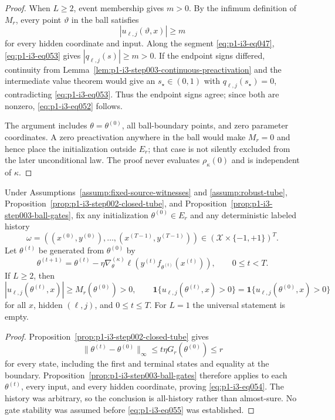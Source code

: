 \begin{proof}
When $L\geq2$, event membership gives $m>0$.  By the infimum definition of
$M_r$, every point $\vartheta$ in the ball satisfies
\[
|u_{\ell,j}(\vartheta,x)|\geq m
\tag{53}\label{eq:p1-i3-eq053}
\]
for every hidden coordinate and input.  Along the segment \eqref{eq:p1-i3-eq047}, \eqref{eq:p1-i3-eq053} gives
$|q_{\ell,j}(s)|\geq m>0$.  If the endpoint signs differed, continuity from
Lemma~\ref{lem:p1-i3-step003-continuous-preactivation} and the intermediate
value theorem would give an $s_\star\in(0,1)$ with
$q_{\ell,j}(s_\star)=0$, contradicting \eqref{eq:p1-i3-eq053}.  Thus the endpoint signs agree;
since both are nonzero, \eqref{eq:p1-i3-eq052} follows.

The argument includes $\theta=\theta^{(0)}$, all ball-boundary points, and
zero parameter coordinates.  A zero preactivation anywhere in the ball would
make $M_r=0$ and hence place the initialization outside $E_r$; that case is
not silently excluded from the later unconditional law.  The proof never
evaluates $\rho_\kappa(0)$ and is independent of $\kappa$.
\end{proof}

\begin{proposition}
\label{prop:p1-i3-step003-history-gates}
Under Assumptions~\ref{assump:fixed-source-witnesses} and
\ref{assump:robust-tube}, Proposition~\ref{prop:p1-i3-step002-closed-tube},
and Proposition~\ref{prop:p1-i3-step003-ball-gates}, fix any initialization
$\theta^{(0)}\in E_r$ and any deterministic labeled history
\[
\omega=((x^{(0)},y^{(0)}),\ldots,(x^{(T-1)},y^{(T-1)}))
\in(\mathcal X\times\{-1,+1\})^T.
\]
Let $\theta^{(t)}$ be generated from $\theta^{(0)}$ by
\[
\theta^{(t+1)}=\theta^{(t)}-\eta\nabla_\theta^{(\kappa)}
\ell\!\left(y^{(t)}f_{\theta^{(t)}}(x^{(t)})\right),
\qquad 0\leq t<T.
\]
If $L\geq2$, then
\[
|u_{\ell,j}(\theta^{(t)},x)|
\geq M_r(\theta^{(0)})>0,
\qquad
\mathbf1\{u_{\ell,j}(\theta^{(t)},x)>0\}
=\mathbf1\{u_{\ell,j}(\theta^{(0)},x)>0\}
\tag{54}\label{eq:p1-i3-eq054}
\]
for all $x$, hidden $(\ell,j)$, and $0\leq t\leq T$.  For $L=1$ the
universal statement is empty.
\end{proposition}

\begin{proof}
Proposition~\ref{prop:p1-i3-step002-closed-tube} gives
\[
\|\theta^{(t)}-\theta^{(0)}\|_\infty
\leq t\eta G_r(\theta^{(0)})\leq r
\tag{55}\label{eq:p1-i3-eq055}
\]
for every state, including the first and terminal states and equality at the
boundary.  Proposition~\ref{prop:p1-i3-step003-ball-gates} therefore applies
to each $\theta^{(t)}$, every input, and every hidden coordinate, proving
\eqref{eq:p1-i3-eq054}.  The history was arbitrary, so the conclusion is all-history rather
than almost-sure.  No gate stability was assumed before \eqref{eq:p1-i3-eq055} was established.
\end{proof}
